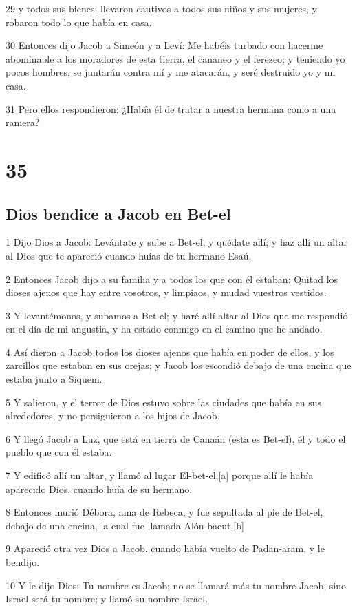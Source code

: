 29 y todos sus bienes; llevaron cautivos a todos sus niños y sus mujeres, y robaron todo lo que había en casa.

30 Entonces dijo Jacob a Simeón y a Leví: Me habéis turbado con hacerme abominable a los moradores de esta tierra, el cananeo y el ferezeo; y teniendo yo pocos hombres, se juntarán contra mí y me atacarán, y seré destruido yo y mi casa.

31 Pero ellos respondieron: ¿Había él de tratar a nuestra hermana como a una ramera?

\chapter{35}

\section{Dios bendice a Jacob en Bet-el}

1 Dijo Dios a Jacob: Levántate y sube a Bet-el, y quédate allí; y haz allí un altar al Dios que te apareció cuando huías de tu hermano Esaú.

2 Entonces Jacob dijo a su familia y a todos los que con él estaban: Quitad los dioses ajenos que hay entre vosotros, y limpiaos, y mudad vuestros vestidos.

3 Y levantémonos, y subamos a Bet-el; y haré allí altar al Dios que me respondió en el día de mi angustia, y ha estado conmigo en el camino que he andado.

4 Así dieron a Jacob todos los dioses ajenos que había en poder de ellos, y los zarcillos que estaban en sus orejas; y Jacob los escondió debajo de una encina que estaba junto a Siquem.

5 Y salieron, y el terror de Dios estuvo sobre las ciudades que había en sus alrededores, y no persiguieron a los hijos de Jacob.

6 Y llegó Jacob a Luz, que está en tierra de Canaán (esta es Bet-el), él y todo el pueblo que con él estaba.

7 Y edificó allí un altar, y llamó al lugar El-bet-el,[a] porque allí le había aparecido Dios, cuando huía de su hermano.

8 Entonces murió Débora, ama de Rebeca, y fue sepultada al pie de Bet-el, debajo de una encina, la cual fue llamada Alón-bacut.[b]

9 Apareció otra vez Dios a Jacob, cuando había vuelto de Padan-aram, y le bendijo.

10 Y le dijo Dios: Tu nombre es Jacob; no se llamará más tu nombre Jacob, sino Israel será tu nombre; y llamó su nombre Israel.

